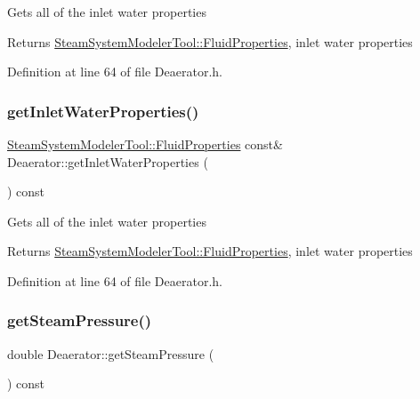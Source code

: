 Gets all of the inlet water properties \begin{DoxyReturn}{Returns}
\hyperlink{struct_steam_system_modeler_tool_1_1_fluid_properties}{Steam\+System\+Modeler\+Tool\+::\+Fluid\+Properties}, inlet water properties 
\end{DoxyReturn}


Definition at line 64 of file Deaerator.\+h.

\mbox{\label{class_deaerator_a9138c93cf6643e91ad7ce0de7fb328b7}} 
\subsubsection{\texorpdfstring{get\+Inlet\+Water\+Properties()}{getInletWaterProperties()}\hspace{0.1cm}{\footnotesize\ttfamily [3/3]}}
{\footnotesize\ttfamily \hyperlink{struct_steam_system_modeler_tool_1_1_fluid_properties}{Steam\+System\+Modeler\+Tool\+::\+Fluid\+Properties} const\& Deaerator\+::get\+Inlet\+Water\+Properties (\begin{DoxyParamCaption}{ }\end{DoxyParamCaption}) const\hspace{0.3cm}{\ttfamily [inline]}}

Gets all of the inlet water properties \begin{DoxyReturn}{Returns}
\hyperlink{struct_steam_system_modeler_tool_1_1_fluid_properties}{Steam\+System\+Modeler\+Tool\+::\+Fluid\+Properties}, inlet water properties 
\end{DoxyReturn}


Definition at line 64 of file Deaerator.\+h.

\mbox{\label{class_deaerator_aebe779c63cace193d040f497e3b70728}} 
\subsubsection{\texorpdfstring{get\+Steam\+Pressure()}{getSteamPressure()}\hspace{0.1cm}{\footnotesize\ttfamily [1/3]}}
{\footnotesize\ttfamily double Deaerator\+::get\+Steam\+Pressure (\begin{DoxyParamCaption}{ }\end{DoxyParamCaption}) const}

